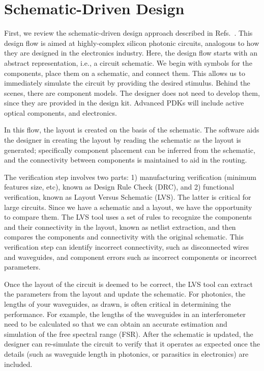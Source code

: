 \documentclass[journal]{spie}
\begin{document}
\section{Schematic-Driven Design}

First, we review the schematic-driven design approach described in Refs.~.   This design flow is aimed at highly-complex silicon photonic circuits, analogous to how they are designed in the electronics industry.  Here, the design flow starts with an abstract representation, i.e., a circuit schematic.  We begin with symbols for the components,  place them on a schematic, and connect them.   This allows us to immediately simulate the circuit by providing the desired stimulus.  Behind the scenes, there are component models.  The designer does not need to develop them, since they are provided in the design kit.  Advanced PDKs will include active optical components, and electronics.  

In this flow, the layout is created on the basis of the schematic.  The software aids the designer in creating the layout by reading the schematic as the layout is generated; specifically component placement can be inferred from the schematic, and the connectivity between components is maintained to aid in the routing.

The verification step involves two parts: 1) manufacturing verification (minimum features size, etc), known as Design Rule Check (DRC), and 2) functional verification, known as Layout Versus Schematic  (LVS).  The latter is critical for large circuits.  Since we have a schematic and a layout, we have the opportunity to compare them.  The LVS tool uses a set of rules to recognize the components and their connectivity in the layout, known as netlist extraction, and then compares the components and connectivity with the original schematic.  This verification step can identify incorrect connectivity, such as disconnected wires and waveguides, and component errors such as incorrect components or incorrect parameters.

Once the layout of the circuit is deemed to be correct, the LVS tool can extract the parameters from the layout and update the schematic.  For photonics, the lengths of your waveguides, as drawn, is often critical in determining the performance.  For example, the lengths of the waveguides in an interferometer need to be calculated so that we can obtain an accurate estimation and simulation of the free spectral range (FSR). After the schematic is updated, the designer can re-simulate the circuit to verify that it operates as expected once the details (such as waveguide length in photonics, or parasitics in electronics) are included.
\end{document}
